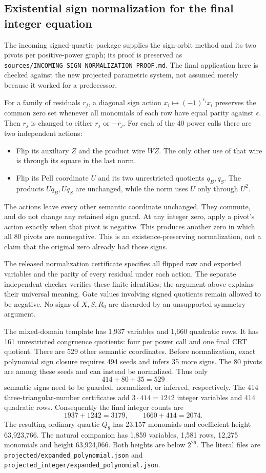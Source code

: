 \subsection{Existential sign normalization for the final integer equation}

The incoming signed-quartic package supplies the sign-orbit method
and its two pivots per positive-power graph; its proof is preserved as
\texttt{sources/INCOMING\_SIGN\_NORMALIZATION\_PROOF.md}.  The final
application here is checked against the new projected parametric system,
not assumed merely because it worked for a predecessor.

For a family of residuals $r_j$, a diagonal sign action
$x_i\mapsto(-1)^{\epsilon_i}x_i$ preserves the common zero set whenever
all monomials of each row have equal parity against $\epsilon$.
Then $r_j$ is changed to either $r_j$ or $-r_j$.
For each of the 40 power calls there are two independent actions:
\begin{itemize}
\item Flip its auxiliary $Z$ and the product wire $WZ$.  The only other
      use of that wire is through its square in the last norm.
\item Flip its Pell coordinate $U$ and its two unrestricted quotients
      $q_B,q_S$.  The products $Uq_B,Uq_S$ are unchanged, while the norm
      uses $U$ only through $U^2$.
\end{itemize}
The actions leave every other semantic coordinate unchanged.  They
commute, and do not change any retained sign guard.  At any integer zero,
apply a pivot's action exactly when that pivot is negative.  This produces
another zero in which all 80 pivots are nonnegative.  This is an
existence-preserving normalization, not a claim that the original zero
already had those signs.

The released normalization certificate specifies all flipped raw and
exported variables and the parity of every residual under each action.
The separate independent checker verifies these finite identities; the
argument above explains their universal meaning.  Gate values involving
signed quotients remain allowed to be negative.  No signs of $X,S,R_0$
are discarded by an unsupported symmetry argument.

The mixed-domain template has 1,937 variables and 1,660 quadratic rows.
It has 161 unrestricted congruence quotients: four per power call and
one final CRT quotient.  There are 529 other semantic coordinates.
Before normalization, exact polynomial sign closure requires 494 seeds
and infers 35 more signs.  The 80 pivots are among these seeds and can
instead be normalized.  Thus only
\[
 414+80+35=529
\]
semantic signs need to be guarded, normalized, or inferred, respectively.
The 414 three-triangular-number certificates add $3\cdot414=1242$
integer variables and 414 quadratic rows.  Consequently the final
integer counts are
\[
 1937+1242=3179,\qquad 1660+414=2074.
\]
The resulting ordinary quartic $Q_8$ has 23,157 monomials and coefficient
height 63,923,766.  The natural companion has 1,859 variables, 1,581 rows,
12,275 monomials and height 63,924,066.  Both heights are below $2^{26}$.
The literal files are \texttt{projected/expanded\_polynomial.json} and
\texttt{projected\_integer/expanded\_polynomial.json}.


